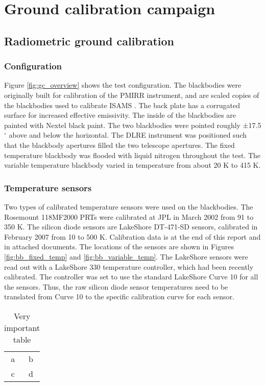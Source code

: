 \section{Ground calibration campaign}

\subsection{Radiometric ground calibration}
\subsubsection{Configuration}
Figure \ref{fig:gc_overview} shows the test configuration.
The blackbodies were originally built for calibration of the PMIRR instrument, and are scaled copies of the blackbodies used to calibrate ISAMS \cite{Nightingale_1991}. The back plate has a corrugated surface for increased effective emissivity.
The inside of the blackbodies are painted with Nextel black paint.
The two blackbodies were pointed roughly ±17.5$^\circ$ above and below the horizontal.
The DLRE instrument was positioned such that the blackbody apertures filled the two telescope apertures.
The fixed temperature blackbody was flooded with liquid nitrogen throughout the test.
The variable temperature blackbody varied in temperature from about 20 K to 415 K.

\subsubsection{Temperature sensors}
Two types of calibrated temperature sensors were used on the blackbodies.
The Rosemount 118MF2000 PRTs were calibrated at JPL in March 2002 from 91 to 350 K.
The silicon diode sensors are LakeShore DT-471-SD sensors, calibrated in February 2007 from 10 to 500 K.
Calibration data is at the end of this report and in attached documents.
The locations of the sensors are shown in Figures \ref{fig:bb_fixed_temp} and \ref{fig:bb_variable_temp}.
The LakeShore sensors were read out with a LakeShore 330 temperature controller, which had been recently calibrated.
The controller was set to use the standard LakeShore Curve 10 for all the sensors.
Thus, the raw silicon diode sensor temperatures need to be translated from Curve 10 to the specific calibration curve for each sensor.

\begin{table} 
    \begin{tabular}{ c c }
        a & b \\ 
        c & d \\ 
    \end{tabular} 
    \caption{Very important table} 
\end{table}




